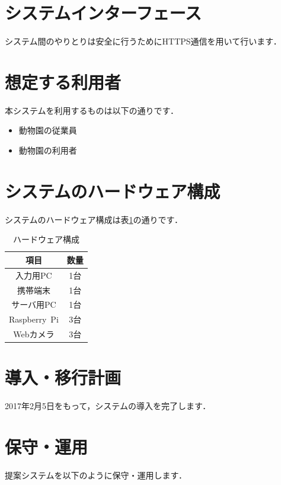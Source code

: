 \documentclass[a4j]{jarticle}
\begin{document}
\section{システムインターフェース}
システム間のやりとりは安全に行うためにHTTPS通信を用いて行います．

\section{想定する利用者}
本システムを利用するものは以下の通りです．
\begin{itemize}
	\item 動物園の従業員
	\item 動物園の利用者
\end{itemize}

\section{システムのハードウェア構成}
システムのハードウェア構成は表\ref{hardware}の通りです．

\begin{table}[H]
	\caption{ハードウェア構成}
	\begin{center}
 	  \begin{tabular}{|c|c|}\hline
            		項目 & 数量 \\ \hline
			入力用PC & 1台 \\ \hline
			携帯端末 & 1台 \\ \hline
			サーバ用PC & 1台 \\ \hline
			Raspberry~Pi & 3台 \\ \hline
			Webカメラ & 3台\\ \hline
		\end{tabular}
		\label{hardware}
	\end{center}
\end{table}



\section{導入・移行計画}
2017年2月5日をもって，システムの導入を完了します．

\section{保守・運用}
提案システムを以下のように保守・運用します．
\end{document}
